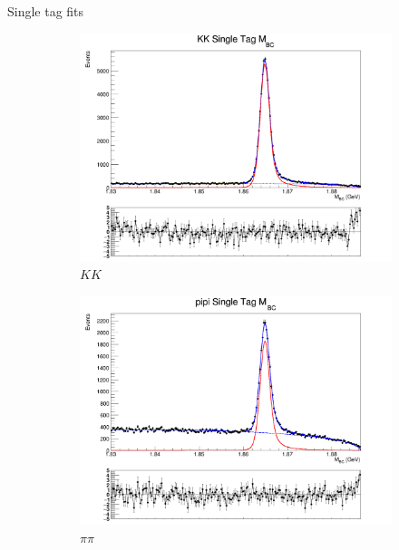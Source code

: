 \documentclass{beamer}
\begin{document}
\begin{frame}{Single tag fits}
  \begin{figure}
    \centering
    \begin{subfigure}{0.33\textwidth}
      \centering
      \includegraphics[width=1.0\textwidth]{Plots/KK_SingleTag_MBC_Plot.png}
      \caption{$KK$}
    \end{subfigure}%
    \begin{subfigure}{0.33\textwidth}
      \centering
      \includegraphics[width=1.0\textwidth]{Plots/pipi_SingleTag_MBC_Plot.png}
      \caption{$\pi\pi$}
    \end{subfigure}
    \begin{subfigure}{0.33\textwidth}
      \centering

\end{subfigure}
\end{figure}
\end{frame}
\end{document}
